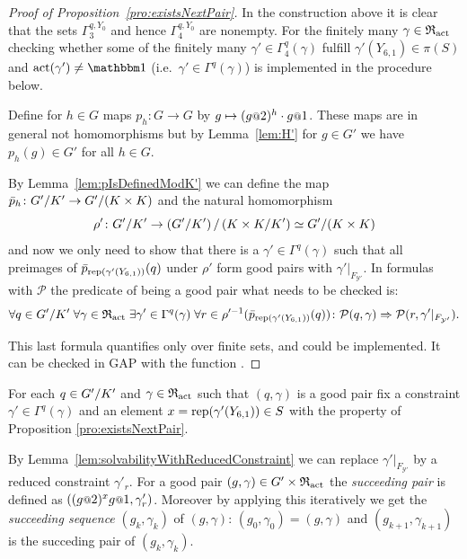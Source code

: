 \documentclass[a4paper,11pt]{amsart}
\begin{document}
\begin{proof}[Proof of Proposition~\ref{pro:existsNextPair}]
 In the construction above it is clear that the sets $\Gamma_3^{q,Y_0}$ and hence $\Gamma_4^{q,Y_0}$
 are nonempty. For the finitely many $\gamma\in \mathfrak{R}_{\operatorname{act}}$ checking whether some of the finitely many 
 $\gamma'\in\Gamma_4^{q}(\gamma)$ fulfill 
 $\gamma'(Y_{6,1}) \in \pi(S)$ and $\act(\gamma')\neq\id$ 
 (i.e.\ $\gamma' \in\Gamma^{q}(\gamma)$) is implemented in the procedure below.
 
 
  Define for $h\in G$ maps $p_h\colon G\to G$ by 
  $g\mapsto (g\at{2})^{h}\cdot g\at{1}$. These maps are in general not
   homomorphisms but   %
  by Lemma~\ref{lem:H'} for $g\in G'$ we have $p_h(g)\in G'$ for all $h\in G$. 
 
  By Lemma~\ref{lem:pIsDefinedModK'} we can define the map $\bar p_h\colon {G'/K'} \to {G'/(K\times K)}$
 and the natural homomorphism \[\rho'\colon {G'/K'} \to {\left({G'/K'}\right)/\left({K\times K/K'}\right)} \simeq {G'/(K\times K)} \]
 and now we only need to show that there is a $\gamma'\in\Gamma^q(\gamma)$ such
 that all preimages of $\bar p_{\operatorname{rep}(\gamma'(Y_{6,1}))}(q)$ under $\rho'$ 
 form good pairs with $\gamma'|_{F_{\mathcal{Y}'}}$. In formulas with $\mathcal{P}$ the predicate of being a good pair what needs to be checked is: 
 \[\forall q\in{G'/K'}\;
      \forall \gamma\in\mathfrak{R}_{\operatorname{act}} \;
	 \exists \gamma'\in \Gamma^q(\gamma)\;
	    \forall r\in \rho'^{-1}(\bar p_{\operatorname{rep}(\gamma'(Y_{6,1}))}(q))\colon
	      \mathcal{P}(q,\gamma) \Rightarrow \mathcal{P}(r,\gamma'|_{F_{\mathcal{Y}'}}).\]
 
 This last formula quantifies only over finite sets, and could be implemented. It can be checked in GAP with the function . 
 \end{proof}

 \begin{defi}
 For each $q\in{G'/K'}$ and $\gamma\in \mathfrak{R}_{\operatorname{act}}$ such that $(q,\gamma)$ is a good pair
 fix a constraint $\gamma'\in\Gamma^q(\gamma)$ and an element 
 $x=\operatorname{rep}(\gamma'(Y_{6,1}))\in S$ with the property of Proposition 
 \ref{pro:existsNextPair}.
 
 By Lemma~\ref{lem:solvabilityWithReducedConstraint} we can replace $\gamma'|_{F_{\mathcal{Y}'}}$ by a reduced constraint $\gamma'_r$. 
 For a good pair $(g,\gamma)\in G'\times\mathfrak{R}_{\operatorname{act}}$ the \emph{succeeding pair} is defined as $\left((g\at{2})^xg\at{1},\gamma'_r\right)$.
 Moreover by applying this iteratively we get the \emph{succeeding sequence} $(g_k,\gamma_k)$ of $(g,\gamma)$: $(g_0,\gamma_0)=(g,\gamma)$ and $(g_{k+1},\gamma_{k+1})$ is the succeding pair of $(g_k,\gamma_k)$.
 \end{defi}
\end{document}
